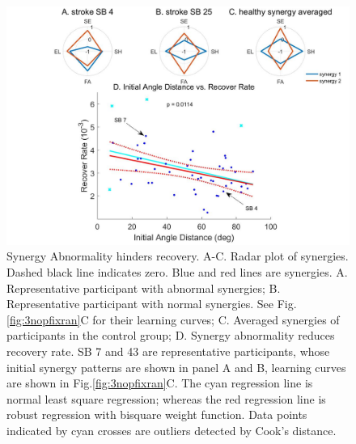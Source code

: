 \begin{figure}
	\centering
	\includegraphics[width=1\linewidth]{figures/6synergy}
	\caption[Synergy Analysis]
	{Synergy Abnormality hinders recovery. 
		A-C. Radar plot of synergies. Dashed black line indicates zero. Blue and red lines are synergies.
		A. Representative participant with abnormal synergies;
		B. Representative participant with normal synergies. See Fig.\ref{fig:3nopfixran}C for their learning curves;
		C. Averaged synergies of participants in the control group;
		D. Synergy abnormality reduces recovery rate. SB 7 and 43 are representative participants, whose initial synergy patterns are shown in panel A and B, learning curves are shown in Fig.\ref{fig:3nopfixran}C.
		The cyan regression line is normal least square regression; whereas the red regression line is robust regression with bisquare weight function. 
		Data points indicated by cyan crosses are outliers detected by Cook's distance.}
	\label{fig:6synergy}
\end{figure}

